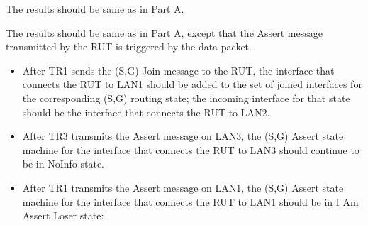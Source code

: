 \documentclass[11pt]{report}
\begin{document}

The results should be same as in Part A.


The results should be same as in Part A, except that the Assert message
transmitted by the RUT is triggered by the data packet.


\begin{itemize}

  \item After TR1 sends the (S,G) Join message to the RUT, the interface that
  connects the RUT to LAN1 should be added to the set of joined interfaces for
  the corresponding (S,G) routing state; the incoming interface for that state
  should be the interface that connects the RUT to LAN2.

  \item After TR3 transmits the Assert message on LAN3, the (S,G) Assert state
  machine for the interface that connects the RUT to LAN3 should continue to
  be in NoInfo state.

  \item After TR1 transmits the Assert message on LAN1, the (S,G) Assert state
  machine for the interface that connects the RUT to LAN1 should be in I Am
  Assert Loser state:


\end{itemize}
\end{document}
